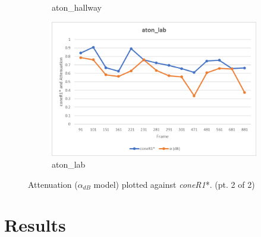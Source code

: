 \begin{appendices}
\begin{figure}
\begin{subfigure}{.45\linewidth}
  \caption{aton\_hallway}
\end{subfigure}
\hfill
\begin{subfigure}{.45\linewidth}
  \includegraphics[width=1\linewidth]{figures/appendix/lab_db.jpg}
  \caption{aton\_lab}
\end{subfigure}
\caption{Attenuation ($\alpha_{dB}$ model) plotted against \textit{coneR1}*. (pt. 2 of 2)}

\end{figure}

\chapter{Results}
\clearpage
\FloatBarrier
\begin{figure}


\end{figure}
\end{appendices}

